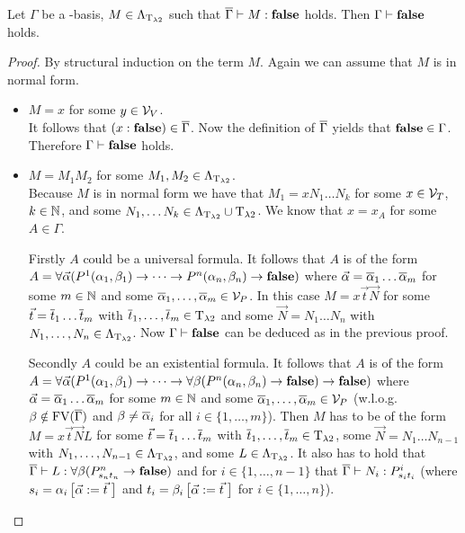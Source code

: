 \begin{lemma}\label{lem.4.4}
Let $\Gamma$ be a \SysP-basis, $M\in\Lambda_{\text{T}_{\lambda2}}$ such that $\overline{\Gamma}\vdash M:\textbf{false}$ holds. Then $\Gamma\vdash\textbf{false}$ holds.
\end{lemma}
\begin{proof}
By structural induction on the term $M$.
Again we can assume that $M$ is in normal form.
\begin{itemize}
	\item[] \underline{$M=x$} for some $y\in\mathcal{V}_V$.\\
		It follows that $(x:\textbf{false})\in\overline{\Gamma}$. Now the definition of $\overline{\Gamma}$ yields that $\textbf{false}\in\Gamma$. Therefore $\Gamma\vdash \textbf{false}$ holds.
	\item[] \underline{$M=M_1M_2$} for some $M_1,M_2\in\Lambda_{\text{T}_{\lambda2}}$.\\
		Because $M$ is in normal form we have that $M_1=xN_1\dots N_k$ for some $x\in\mathcal{V}_T$, $k\in\mathbb{N}$, and some $N_1,\dots N_k\in\Lambda_{\text{T}_{\lambda2}}\cup\text{T}_{\lambda2}$.
		We know that $x=x_A$ for some $A\in\Gamma$.
		
		Firstly $A$ could be a universal formula. It follows that $A$ is of the form $A=\forall\predVec(P^1(\predFst[1],\predSnd[1])\to\dots\to P^n(\predFst[n],\predSnd[n])\to\false)$ where $\predVec=\predVec[1]\dots\predVec[m]$ for some $m\in\mathbb{N}$ and some $\predVec[1],\dots,\predVec[m]\in\VarP$. In this case $M=x\vec{t}\vec{N}$ for some $\predTVec=\predTVec[1]\dots \predTVec[m]$ with $\predTVec[1],\dots,\predTVec[m]\in\lambdaTypes$ and some $\vec{N}=N_1\dots N_n$ with $N_1,\dots,N_n\in\Lambda_{\text{T}_{\lambda2}}$. Now $\Gamma\vdash\textbf{false}$ can be deduced as in the previous proof.
		
		Secondly $A$ could be an existential formula. It follows that $A$ is of the form $A=\forall\predVec(P^1(\predFst[1],\predSnd[1])\to\dots\to \forall\beta(P^n(\predFst[n],\predSnd[n])\to\false)\to \false)$ where $\predVec=\predVec[1]\dots\predVec[m]$ for some $m\in\mathbb{N}$ and some $\predVec[1],\dots,\predVec[m]\in\VarP$ (w.l.o.g. $\beta\notin\text{FV}(\overline{\Gamma})$ and $\beta\neq\predVec[i]$ for all $i\in\{1,\dots,m\}$).
		Then $M$ has to be of the form $M=x\vec{t}\vec{N}L$ for some $\predTVec=\predTVec[1]\dots \predTVec[m]$ with $\predTVec[1],\dots,\predTVec[m]\in\lambdaTypes$, some $\vec{N}=N_1\dots N_{n-1}$ with $N_1,\dots,N_{n-1}\in\Lambda_{\text{T}_{\lambda2}}$, and some $L\in\Lambda_{\text{T}_{\lambda2}}$. It also has to hold that $\trans{\Gamma}\lambdaModels L:\forall\beta(\code{P^n}{\predTFst[n]}{\predTSnd[n]}\to\false)$ and for $i\in\{1,\dots,n-1\}$ that $\trans{\Gamma}\lambdaModels N_i:\code{P^i}{\predTFst[i]}{\predTSnd[i]}$ (where $\predTFst[i]=\predFst[i]\left[\predVec:=\predTVec\hspace{1mm}\right]$ and  $\predTSnd[i]=\predSnd[i]\left[\predVec:=\predTVec\hspace{1mm}\right]$ for $i\in\{1,\dots,n\}$).
		

\end{itemize}
\end{proof}
